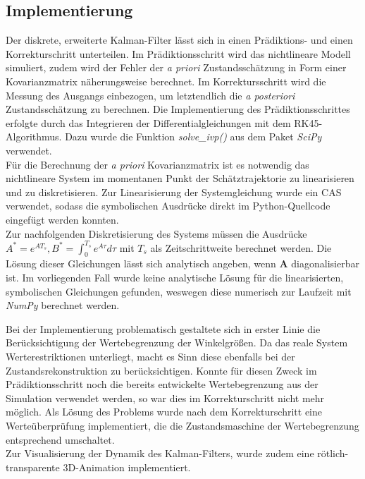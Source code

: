 \documentclass[times, 10pt,twocolumn]{article}
\begin{document}
	\subsection{Implementierung}
	Der diskrete, erweiterte Kalman-Filter lässt sich in einen Prädiktions- und einen Korrekturschritt unterteilen.  Im Prädiktionsschritt wird das nichtlineare Modell simuliert, zudem wird der Fehler der \textit{a priori} Zustandsschätzung in Form einer Kovarianzmatrix näherungsweise berechnet. Im Korrektursschritt wird die Messung des Ausgangs einbezogen, um letztendlich die \textit{a posteriori} Zustandsschätzung zu berechnen. Die Implementierung des Prädiktionsschrittes erfolgte durch das Integrieren der Differentialgleichungen mit dem RK45-Algorithmus. Dazu wurde die Funktion \textit{solve\_ivp()} aus dem Paket \textit{SciPy} verwendet. \\ Für die Berechnung der \textit{a priori} Kovarianzmatrix ist es notwendig das nichtlineare System im momentanen Punkt der Schätztrajektorie zu linearisieren und zu diskretisieren. Zur Linearisierung der Systemgleichung wurde ein CAS verwendet, sodass die symbolischen Ausdrücke direkt im Python-Quellcode eingefügt werden konnten. \\ Zur nachfolgenden Diskretisierung des Systems müssen die Ausdrücke $A^* = e^{A T_s}, B^* = \int_{0}^{T_s} e^{A \tau} d\tau$ mit $T_s$ als Zeitschrittweite berechnet werden. 
	Die Lösung dieser Gleichungen lässt sich analytisch angeben, wenn $\bm A$	diagonalisierbar ist. Im vorliegenden Fall wurde keine analytische Lösung für die linearisierten, symbolischen Gleichungen gefunden, weswegen diese numerisch zur Laufzeit mit \textit{NumPy} berechnet werden. \\

	Bei der Implementierung problematisch gestaltete sich in erster Linie die Berücksichtigung der Wertebegrenzung der Winkelgrößen. Da das reale System Werterestriktionen unterliegt, macht es Sinn diese ebenfalls bei der Zustandsrekonstruktion zu berücksichtigen. Konnte für diesen Zweck im Prädiktionsschritt noch die bereits entwickelte Wertebegrenzung aus der Simulation verwendet werden, so war dies im Korrekturschritt nicht mehr möglich. Als Lösung des Problems wurde nach dem Korrekturschritt eine Werteüberprüfung implementiert, die die Zustandsmaschine der Wertebegrenzung entsprechend umschaltet. \\
	Zur Visualisierung der Dynamik des Kalman-Filters, wurde zudem eine rötlich-transparente 3D-Animation implementiert.
	
\end{document}
